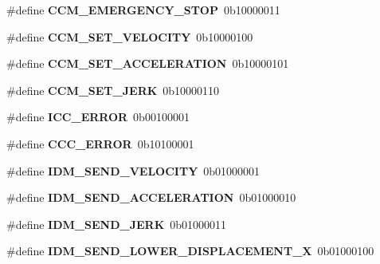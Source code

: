 \begin{DoxyCompactItemize}
\item 
\hypertarget{group__cmd__macros_gada8acf9bc081e09bc3adb94eb0dc3a61}{}\label{group__cmd__macros_gada8acf9bc081e09bc3adb94eb0dc3a61} 
\#define {\bfseries C\+C\+M\+\_\+\+E\+M\+E\+R\+G\+E\+N\+C\+Y\+\_\+\+S\+T\+OP}~0b10000011
\item 
\hypertarget{group__cmd__macros_ga6eae1a94f05aac36ce4b9d4b2bec5802}{}\label{group__cmd__macros_ga6eae1a94f05aac36ce4b9d4b2bec5802} 
\#define {\bfseries C\+C\+M\+\_\+\+S\+E\+T\+\_\+\+V\+E\+L\+O\+C\+I\+TY}~0b10000100
\item 
\hypertarget{group__cmd__macros_ga17f2f2be47d097b9483ca48e746d562f}{}\label{group__cmd__macros_ga17f2f2be47d097b9483ca48e746d562f} 
\#define {\bfseries C\+C\+M\+\_\+\+S\+E\+T\+\_\+\+A\+C\+C\+E\+L\+E\+R\+A\+T\+I\+ON}~0b10000101
\item 
\hypertarget{group__cmd__macros_gadf254dc138e7e967ee64d8969f6087ee}{}\label{group__cmd__macros_gadf254dc138e7e967ee64d8969f6087ee} 
\#define {\bfseries C\+C\+M\+\_\+\+S\+E\+T\+\_\+\+J\+E\+RK}~0b10000110
\item 
\hypertarget{group__cmd__macros_ga5aaa2fadcba4170d827ff67e7016230c}{}\label{group__cmd__macros_ga5aaa2fadcba4170d827ff67e7016230c} 
\#define {\bfseries I\+C\+C\+\_\+\+E\+R\+R\+OR}~0b00100001
\item 
\hypertarget{group__cmd__macros_ga9ba48d0b3933887b260feb45b662a28a}{}\label{group__cmd__macros_ga9ba48d0b3933887b260feb45b662a28a} 
\#define {\bfseries C\+C\+C\+\_\+\+E\+R\+R\+OR}~0b10100001
\item 
\hypertarget{group__cmd__macros_gac3919c93d4aa78af1252d50924ec4635}{}\label{group__cmd__macros_gac3919c93d4aa78af1252d50924ec4635} 
\#define {\bfseries I\+D\+M\+\_\+\+S\+E\+N\+D\+\_\+\+V\+E\+L\+O\+C\+I\+TY}~0b01000001
\item 
\hypertarget{group__cmd__macros_ga4635dc6a1dc0edd163932fe236590079}{}\label{group__cmd__macros_ga4635dc6a1dc0edd163932fe236590079} 
\#define {\bfseries I\+D\+M\+\_\+\+S\+E\+N\+D\+\_\+\+A\+C\+C\+E\+L\+E\+R\+A\+T\+I\+ON}~0b01000010
\item 
\hypertarget{group__cmd__macros_ga945771b57d033650704c3f6d7a48c454}{}\label{group__cmd__macros_ga945771b57d033650704c3f6d7a48c454} 
\#define {\bfseries I\+D\+M\+\_\+\+S\+E\+N\+D\+\_\+\+J\+E\+RK}~0b01000011
\item 
\hypertarget{group__cmd__macros_gae4f2599f72ab00c8ef63d485b8e54fb8}{}\label{group__cmd__macros_gae4f2599f72ab00c8ef63d485b8e54fb8} 
\#define {\bfseries I\+D\+M\+\_\+\+S\+E\+N\+D\+\_\+\+L\+O\+W\+E\+R\+\_\+\+D\+I\+S\+P\+L\+A\+C\+E\+M\+E\+N\+T\+\_\+X}~0b01000100

\end{DoxyCompactItemize}
